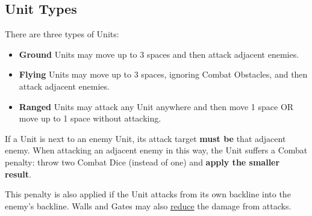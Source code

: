 \begin{multicols}{2}
\subsection*{\hypertarget{Unittype}{Unit Types}}
There are three types of Units:
\begin{itemize}
  \item \textbf{Ground}  Units may move up to 3 spaces and then attack adjacent enemies.
  \item \textbf{Flying}  Units may move up to 3 spaces, ignoring Combat Obstacles, and then attack adjacent enemies.
  \item \textbf{Ranged}  Units may attack any Unit anywhere and then move 1 space OR move up to 1 space without attacking.
\end{itemize}
If a  Unit is next to an enemy Unit, its attack target \textbf{must be} that adjacent enemy.
When attacking an adjacent enemy in this way, the  Unit suffers a Combat penalty: throw two Combat Dice (instead of one) and \textbf{apply the smaller result}.\par
This penalty is also applied if the  Unit attacks from its own backline into the enemy's backline.
Walls and Gates may also \hyperlink{Walls}{reduce} the damage from   attacks.


\end{multicols}
